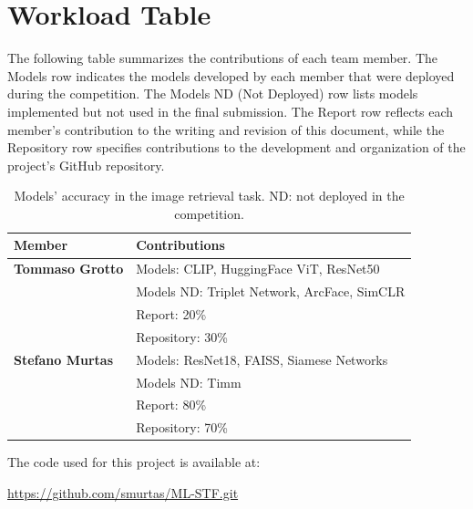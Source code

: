 \documentclass[10pt,twocolumn,letterpaper]{article}
\begin{document}
\section{Workload Table}
The following table summarizes the contributions of each team member.
The Models row indicates the models developed by each member that were deployed during the competition. The Models ND (Not Deployed) row lists models implemented but not used in the final submission. The Report row reflects each member’s contribution to the writing and revision of this document, while the Repository row specifies contributions to the development and organization of the project’s GitHub repository.

\begin{table}[ht]
\centering
\caption{Models' accuracy in the image retrieval task. ND: not deployed in the competition.}
\begin{tabular}{l p{4.5cm}}
\hline
\textbf{Member} & \textbf{Contributions} \\
\hline
\textbf{Tommaso Grotto} & Models: CLIP, HuggingFace ViT, ResNet50 \\
                        & Models ND: Triplet Network, ArcFace, SimCLR \\
                        & Report: 20\%\\
                        & Repository: 30\% \\
\textbf{Stefano Murtas} & Models: ResNet18, FAISS, Siamese Networks \\
                        & Models ND: Timm \\
                        & Report: 80\%\\
                        & Repository: 70\% \\
\hline
\end{tabular}
\end{table}

The code used for this project is available at:

\url{https://github.com/smurtas/ML-STF.git}
\end{document}
